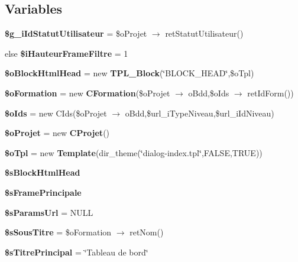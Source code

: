 \subsection*{Variables}
\begin{CompactItemize}
\item 
\textbf{\$g\_\-iIdStatutUtilisateur} = \$oProjet $\rightarrow$ retStatutUtilisateur()\label{tableau__bord-index_8php_0ba1c61df13b049d1934212b8b0e609c}

\item 
else \textbf{\$iHauteurFrameFiltre} = 1\label{tableau__bord-index_8php_9eaeddd985645748b24ee310ed2f01fe}

\item 
\textbf{\$oBlockHtmlHead} = new {\bf TPL\_\-Block}(\char`\"{}BLOCK\_\-HEAD\char`\"{},\$oTpl)\label{tableau__bord-index_8php_43200cee341aed52a8892c72ce32f5a1}

\item 
\textbf{\$oFormation} = new {\bf CFormation}(\$oProjet $\rightarrow$ oBdd,\$oIds $\rightarrow$ retIdForm())\label{tableau__bord-index_8php_5dbadfcf71ff9339b4bb2320f35a7b04}

\item 
\textbf{\$oIds} = new CIds(\$oProjet $\rightarrow$ oBdd,\$url\_\-iTypeNiveau,\$url\_\-iIdNiveau)\label{tableau__bord-index_8php_87e9fcad45d9de21f44bfbb0e94f46cd}

\item 
\textbf{\$oProjet} = new {\bf CProjet}()\label{tableau__bord-index_8php_ec412e7ac901485e72b77d2185159421}

\item 
\textbf{\$oTpl} = new {\bf Template}(dir\_\-theme(\char`\"{}dialog-index.tpl\char`\"{},FALSE,TRUE))\label{tableau__bord-index_8php_7de57ba665b7c068e98ea46469be2865}

\item 
\textbf{\$sBlockHtmlHead}
\item 
\textbf{\$sFramePrincipale}
\item 
\textbf{\$sParamsUrl} = NULL\label{tableau__bord-index_8php_51e1d6c58e7c827b19f08440f9f95f1d}

\item 
\textbf{\$sSousTitre} = \$oFormation $\rightarrow$ retNom()\label{tableau__bord-index_8php_9d1c9b88a447a7799c9d4ae766d48f97}

\item 
\textbf{\$sTitrePrincipal} = \char`\"{}Tableau de bord\char`\"{}\label{tableau__bord-index_8php_fea8d4fcd78ba359779b74b031511ea5}


\end{CompactItemize}
